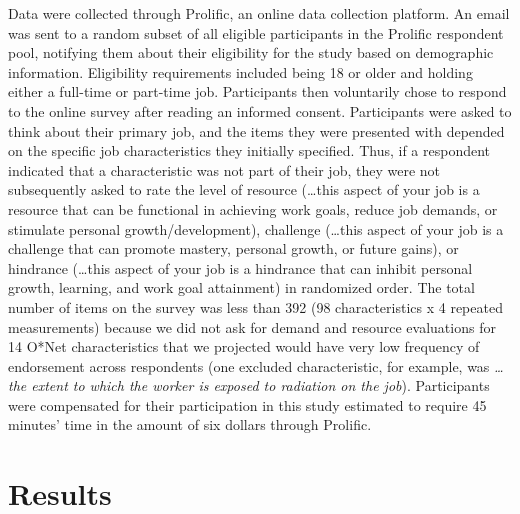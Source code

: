 \documentclass[
  man,mask]{apa7}
\begin{document}
Data were collected through Prolific, an online data collection platform. An email was sent to a random subset of all eligible participants in the Prolific respondent pool, notifying them about their eligibility for the study based on demographic information. Eligibility requirements included being 18 or older and holding either a full-time or part-time job. Participants then voluntarily chose to respond to the online survey after reading an informed consent. Participants were asked to think about their primary job, and the items they were presented with depended on the specific job characteristics they initially specified. Thus, if a respondent indicated that a characteristic was not part of their job, they were not subsequently asked to rate the level of resource (\ldots this aspect of your job is a resource that can be functional in achieving work goals, reduce job demands, or stimulate personal growth/development), challenge (\ldots this aspect of your job is a challenge that can promote mastery, personal growth, or future gains), or hindrance (\ldots this aspect of your job is a hindrance that can inhibit personal growth, learning, and work goal attainment) in randomized order. The total number of items on the survey was less than 392 (98 characteristics x 4 repeated measurements) because we did not ask for demand and resource evaluations for 14 O*Net characteristics that we projected would have very low frequency of endorsement across respondents (one excluded characteristic, for example, was \emph{\ldots the extent to which the worker is exposed to radiation on the job}). Participants were compensated for their participation in this study estimated to require 45 minutes' time in the amount of six dollars through Prolific.

\hypertarget{results}{%
\section{Results}\label{results}}
\end{document}
